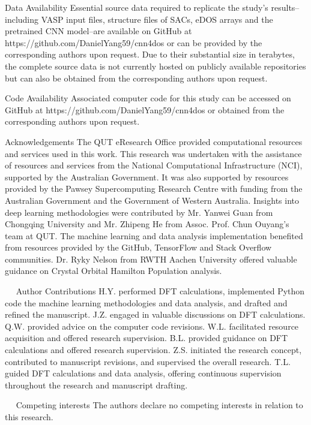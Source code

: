 Data Availability
Essential source data required to replicate the study's results–including VASP input files, structure files of SACs, eDOS arrays and the pretrained CNN model–are available on GitHub at https://github.com/DanielYang59/cnn4dos or can be provided by the corresponding authors upon request. Due to their substantial size in terabytes, the complete source data is not currently hosted on publicly available repositories but can also be obtained from the corresponding authors upon request.


Code Availability
Associated computer code for this study can be accessed on GitHub at https://github.com/DanielYang59/cnn4dos or obtained from the corresponding authors upon request.


Acknowledgements
The QUT eResearch Office provided computational resources and services used in this work. This research was undertaken with the assistance of resources and services from the National Computational Infrastructure (NCI), supported by the Australian Government. It was also supported by resources provided by the Pawsey Supercomputing Research Centre with funding from the Australian Government and the Government of Western Australia. Insights into deep learning methodologies were contributed by Mr. Yanwei Guan from Chongqing University and Mr. Zhipeng He from Assoc. Prof. Chun Ouyang's team at QUT. The machine learning and data analysis implementation benefited from resources provided by the GitHub, TensorFlow and Stack Overflow communities. Dr. Ryky Nelson from RWTH Aachen University offered valuable guidance on Crystal Orbital Hamilton Population analysis.


 
Author Contributions
H.Y. performed DFT calculations, implemented Python code the machine learning methodologies and data analysis, and drafted and refined the manuscript. J.Z. engaged in valuable discussions on DFT calculations. Q.W. provided advice on the computer code revisions. W.L. facilitated resource acquisition and offered research supervision. B.L. provided guidance on DFT calculations and offered research supervision. Z.S. initiated the research concept, contributed to manuscript revisions, and supervised the overall research. T.L. guided DFT calculations and data analysis, offering continuous supervision throughout the research and manuscript drafting.


 
Competing interests
The authors declare no competing interests in relation to this research.

